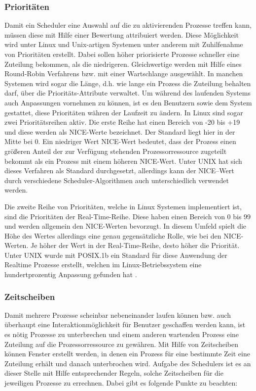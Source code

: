 \subsubsection{Prioritäten}
Damit ein Scheduler eine Auswahl auf die zu aktivierenden Prozesse treffen kann, müssen diese mit Hilfe einer Bewertung attribuiert werden. Diese Möglichkeit wird unter Linux und Unix-artigen Systemen unter anderem mit Zuhilfenahme von Prioritäten erstellt.
Dabei sollen höher priorisierte Prozesse schneller eine Zuteilung bekommen, als die niedrigeren. Gleichwertige werden mit Hilfe eines Round-Robin Verfahrens bzw. mit einer Wartschlange ausgewählt. In manchen Systemen wird sogar die Länge, d.h. wie lange ein Prozess die Zuteilung behalten darf, über die Prioritäts-Attribute verwaltet. Um während des laufenden Systems auch Anpassungen vornehmen zu kön\-nen, ist es den Benutzern sowie dem System gestattet, diese Prioritäten währen der Laufzeit zu ändern.
In Linux sind sogar zwei Prioritäts\-reihen aktiv. Die erste Reihe hat einen Bereich von -20 bis +19 und diese werden als \glqq NICE\grqq-Werte bezeichnet. Der Standard liegt hier in der Mitte bei 0. Ein niedriger Wert \glqq NICE\grqq-Wert bedeutet, dass der Prozess einen größeren Anteil der zur Verfügung stehenden Prozessorressource zugeteilt bekommt als ein Prozess mit einem höheren \glqq NICE\grqq-Wert.
Unter UNIX hat sich dieses Verfahren als Standard durchgesetzt, allerdings kann der \glqq NICE\grqq--Wert durch verschiedene Scheduler-Algorithmen auch unterschiedlich verwendet werden.

Die zweite Reihe von Prioritäten, welche in Linux Systemen implementiert ist, sind die Prioritäten der \glqq Real-Time\grqq-Reihe. Diese haben einen Bereich von 0 bis 99 und werden allgemein den \glqq NICE\grqq-Werten bevorzugt. In diesem Umfeld spielt die Höhe des Wertes allerdings eine genau gegensätzliche Rolle,  wie bei den \glqq NICE\grqq-Werten. Je höher der Wert in der \glqq Real-Time\grqq-Reihe, desto höher die Priorität. Unter UNIX wurde mit POSIX.1b ein Standard für diese Anwendung der Realtime Prozesse erstellt, welchen im Linux-Betriebssystem eine hundertprozentig Anpassung gefunden hat \cite{rlove}.

\subsubsection{Zeitscheiben}
Damit mehrere Prozesse scheinbar nebeneinander laufen können bzw. auch überhaupt eine Interaktionmöglichkeit für Benutzer geschaffen werden kann, ist es nötig Prozesse zu unterbrechen und einem anderen wartenden Prozess eine Zuteilung auf die Prozessor\-ressource zu gewähren. Mit Hilfe von Zeitscheiben können Fenster erstellt werden, in denen ein Prozess für eine bestimmte Zeit eine Zuteilung erhält und danach unterbrochen wird.
Aufgabe des Schedulers ist es an dieser Stelle mit Hilfe entsprechender Regeln, solche Zeitscheiben  für die jeweiligen Prozesse zu errechnen. Dabei gibt es folgende Punkte zu beachten:

